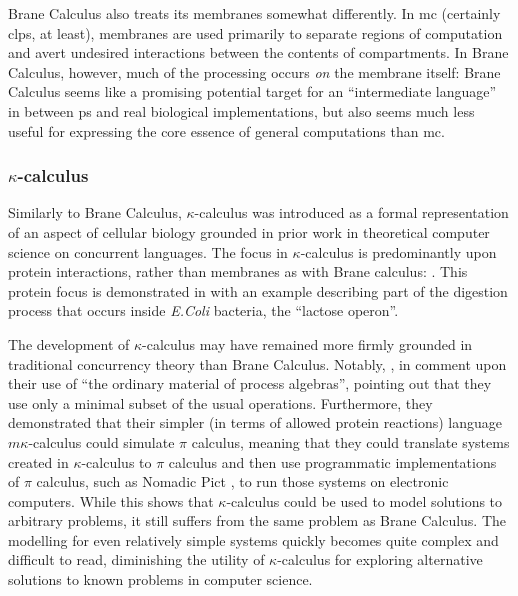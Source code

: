 Brane Calculus also treats its membranes somewhat differently.  In \gls{mc} (certainly \gls{clps}, at least), membranes are used primarily to separate regions of computation and avert undesired interactions between the contents of \glspl{compartment}.  In Brane Calculus, however, much of the processing occurs \emph{on} the membrane itself:   Brane Calculus seems like a promising potential target for an ``intermediate language'' in between \gls{ps} and real biological implementations, but also seems much less useful for expressing the core essence of general computations than \gls{mc}.

\subsubsection{\(\kappa\)-calculus}

Similarly to Brane Calculus, \(\kappa\)-calculus \cite{Danos2004} was introduced as a formal representation of an aspect of cellular biology grounded in prior work in theoretical computer science on concurrent languages.  The focus in \(\kappa\)-calculus is predominantly upon protein interactions, rather than membranes as with Brane calculus: .  This protein focus is demonstrated in \cite{Danos2004} with an example describing part of the digestion process that occurs inside \textit{E.Coli} bacteria, the \enquote{lactose operon}.

The development of \(\kappa\)-calculus may have remained more firmly grounded in traditional concurrency theory than Brane Calculus.  Notably, \citeauthor{Danos2004}, in  comment upon their use of \enquote{the ordinary material of process algebras}, pointing out that they use only a minimal subset of the usual operations.  Furthermore, they demonstrated that their simpler (in terms of allowed protein reactions) language \(m\kappa\)-calculus could simulate \(\pi\) calculus, meaning that they could translate systems created in \(\kappa\)-calculus to \(\pi\) calculus and then use programmatic implementations of \(\pi\) calculus, such as Nomadic Pict \cite{Unyapoth2001}, to run those systems on electronic computers.  While this shows that \(\kappa\)-calculus could be used to model solutions to arbitrary problems, it still suffers from the same problem as Brane Calculus.  The modelling for even relatively simple systems quickly becomes quite complex and difficult to read, diminishing the utility of \(\kappa\)-calculus for exploring alternative solutions to known problems in computer science.

